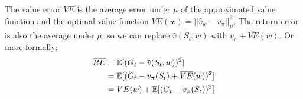 The value error $\overline{VE}$ is the average error under $\mu$ of the approximated value function and the optimal value function $\overline{VE}(w) = || \hat{v}_w - v_\pi ||_{\mu}^2$. The return error is also the average under $\mu$, so we can replace $\hat{v}(S_t, w)$ with $v_\pi + \overline{VE}(w)$. Or more formally:
\begin{equation}
\begin{split}
\overline{RE} & = \operatorname{\mathbb{E}}[(G_t - \hat{v}(S_t, w))^2] \\
& = \operatorname{\mathbb{E}}[(G_t-v_{\pi}(S_t)+\overline{VE}(w))^2] \\
& = \overline{VE}(w) + \operatorname{\mathbb{E}}[(G_t-v_{\pi}(S_t))^2] \\
\end{split}
\label{eq:exercise 11.4 solution}
\end{equation}
